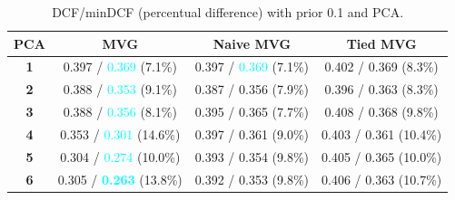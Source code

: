 \documentclass[12pt]{report}
\begin{document}
\begin{table}[H]
    \centering
    \begin{tabular}{|c|c|c|c|}
        \hline
        \rowcolor{blue!10}
        \textbf{PCA} & \textbf{MVG}                                      & \textbf{Naive MVG}                      & \textbf{Tied MVG}      \\
        \hline
        \textbf{1}   & 0.397 / \textcolor{cyan}{0.369} (7.1\%)           & 0.397 / \textcolor{cyan}{0.369} (7.1\%) & 0.402 / 0.369 (8.3\%)  \\
        \hline
        \textbf{2}   & 0.388 / \textcolor{cyan}{0.353} (9.1\%)           & 0.387 / 0.356 (7.9\%)                   & 0.396 / 0.363 (8.3\%)  \\
        \hline
        \textbf{3}   & 0.388 / \textcolor{cyan}{0.356} (8.1\%)           & 0.395 / 0.365 (7.7\%)                   & 0.408 / 0.368 (9.8\%)  \\
        \hline
        \textbf{4}   & 0.353 / \textcolor{cyan}{0.301} (14.6\%)          & 0.397 / 0.361 (9.0\%)                   & 0.403 / 0.361 (10.4\%) \\
        \hline
        \textbf{5}   & 0.304 / \textcolor{cyan}{0.274} (10.0\%)          & 0.393 / 0.354 (9.8\%)                   & 0.405 / 0.365 (10.0\%) \\
        \hline
        \textbf{6}   & 0.305 / \textcolor{cyan}{\textbf{0.263}} (13.8\%) & 0.392 / 0.353 (9.8\%)                   & 0.406 / 0.363 (10.7\%) \\
        \hline
    \end{tabular}
    \caption{DCF/minDCF (percentual difference) with prior 0.1 and PCA.}
    \label{tab:DCF_MVG_PCA_0.1}
\end{table}
\end{document}
